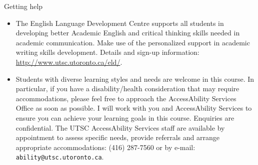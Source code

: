\documentclass[unknownkeysallowed]{beamer}\usepackage[]{graphicx}\usepackage[]{color}
\begin{document}
\begin{frame}[fragile]{Getting help}

  \begin{itemize}
  \item The English Language Development Centre supports all students
    in developing better Academic English and critical thinking skills
    needed in academic communication. Make use of the personalized
    support in academic writing skills development. Details and sign-up information:
    \url{http://www.utsc.utoronto.ca/eld/}.
  \item      Students with diverse learning styles and needs are welcome in this
course. In particular, if you have a disability/health consideration
that may require accommodations, please feel free to approach the AccessAbility Services Office as soon as possible. I will
work with you and AccessAbility Services to ensure you can achieve
your learning goals in this course. Enquiries are confidential. The
UTSC AccessAbility Services staff are available by
appointment to assess specific needs, provide referrals and arrange
appropriate accommodations: (416) 287-7560 or by e-mail: \texttt{ability@utsc.utoronto.ca}.


  \end{itemize}
  
\end{frame}


% 
% 
% 
% 
% 
% 
% 
%  
% 
% 
% 
% 
% 
% 
% 
% 
% 
% 
%  
% 
\end{document}
